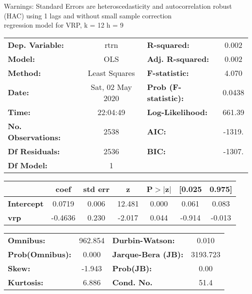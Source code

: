 Warnings: \newline
 [1] Standard Errors are heteroscedasticity and autocorrelation robust (HAC) using 1 lags and without small sample correction\\ 

regression model for VRP, k = 12 h = 9\begin{center}
\begin{tabular}{lclc}
\toprule
\textbf{Dep. Variable:}    &       rtrn       & \textbf{  R-squared:         } &     0.002   \\
\textbf{Model:}            &       OLS        & \textbf{  Adj. R-squared:    } &     0.002   \\
\textbf{Method:}           &  Least Squares   & \textbf{  F-statistic:       } &     4.070   \\
\textbf{Date:}             & Sat, 02 May 2020 & \textbf{  Prob (F-statistic):} &   0.0438    \\
\textbf{Time:}             &     22:04:49     & \textbf{  Log-Likelihood:    } &    661.39   \\
\textbf{No. Observations:} &        2538      & \textbf{  AIC:               } &    -1319.   \\
\textbf{Df Residuals:}     &        2536      & \textbf{  BIC:               } &    -1307.   \\
\textbf{Df Model:}         &           1      & \textbf{                     } &             \\
\bottomrule
\end{tabular}
\begin{tabular}{lcccccc}
                   & \textbf{coef} & \textbf{std err} & \textbf{z} & \textbf{P$> |$z$|$} & \textbf{[0.025} & \textbf{0.975]}  \\
\midrule
\textbf{Intercept} &       0.0719  &        0.006     &    12.481  &         0.000        &        0.061    &        0.083     \\
\textbf{vrp}       &      -0.4636  &        0.230     &    -2.017  &         0.044        &       -0.914    &       -0.013     \\
\bottomrule
\end{tabular}
\begin{tabular}{lclc}
\textbf{Omnibus:}       & 962.854 & \textbf{  Durbin-Watson:     } &    0.010  \\
\textbf{Prob(Omnibus):} &   0.000 & \textbf{  Jarque-Bera (JB):  } & 3193.723  \\
\textbf{Skew:}          &  -1.943 & \textbf{  Prob(JB):          } &     0.00  \\
\textbf{Kurtosis:}      &   6.886 & \textbf{  Cond. No.          } &     51.4  \\
\bottomrule
\end{tabular}
\end{center}

